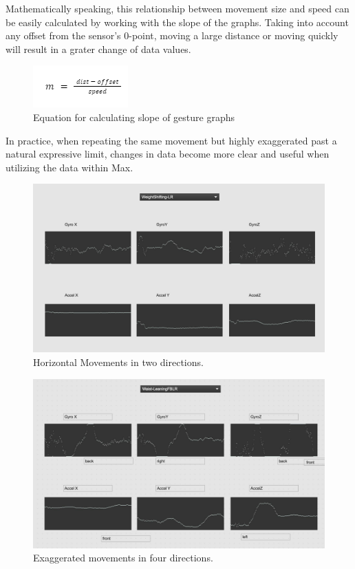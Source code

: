 Mathematically speaking, this relationship between movement size and speed can be easily calculated by working with the slope of the graphs. Taking into account any offset from the sensor's 0-point, moving a large distance or moving quickly will result in a grater change of data values.

\begin{figure}
    \centering
    \includegraphics{slopeEqu.png}
    \caption{Equation for calculating slope of gesture graphs}
    \label{fig:mequSlope}
\end{figure}

In practice, when repeating the same movement but highly exaggerated past a natural expressive limit, changes in data become more clear and useful when utilizing the data within Max. 

\begin{figure}
    \centering
    \includegraphics[scale=0.2]{diagrams/gestureData/weightshifting.png}
    \caption{Horizontal Movements in two directions.}
    \label{fig:exHor}
\end{figure}

\begin{figure}
    \centering
    \includegraphics[scale=0.2]{diagrams/gestureData/waistLeaning.png}
    \caption{Exaggerated movements in four directions.}
    \label{fig:exVert}
\end{figure}

